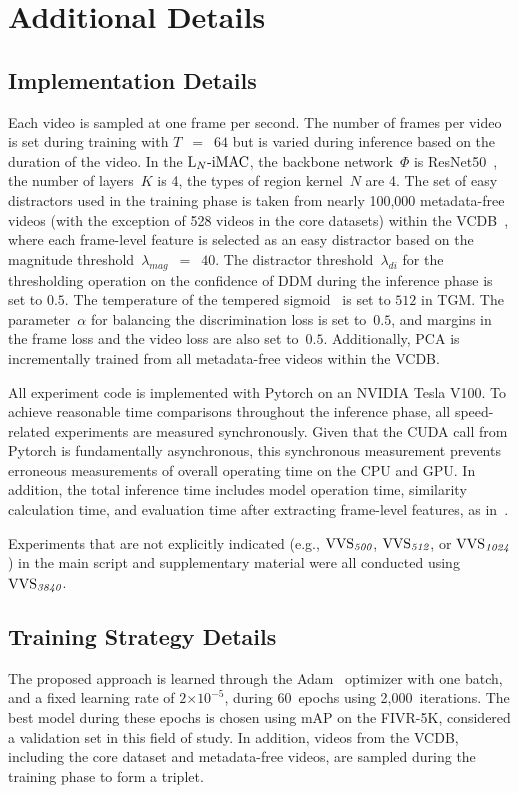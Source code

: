 \documentclass[10pt,twocolumn,letterpaper]{article}
\begin{document}
\section{Additional Details}\label{detail}
    \subsection{Implementation Details}\label{imple}
        Each video is sampled at one frame per second. The number of frames per video is set during training with $T$~$=$~$64$ but is varied during inference based on the duration of the video. In the $\textup{L}_{N}\textup{-iMAC}$, the backbone network~$\Phi$ is ResNet50~\cite{he2016deep}, the number of layers~$K$ is 4, the types of region kernel~$N$ are 4. The set of easy distractors used in the training phase is taken from nearly 100,000 metadata-free videos (with the exception of 528 videos in the core datasets) within the VCDB~\cite{jiang2014vcdb}, where each frame-level feature is selected as an easy distractor based on the magnitude threshold~$\lambda_{mag}$~$=$~$40$. The distractor threshold~$\lambda_{di}$ for the thresholding operation on the confidence of DDM during the inference phase is set to $0.5$. The temperature of the tempered sigmoid~\cite{papernot2021tempered} is set to $512$ in TGM. The parameter~$\alpha$ for balancing the discrimination loss is set to~$0.5$, and margins in the frame loss and the video loss are also set to~$0.5$. Additionally, PCA is incrementally trained from all metadata-free videos within the VCDB.
        
        All experiment code is implemented with Pytorch on an NVIDIA Tesla V100. To achieve reasonable time comparisons throughout the inference phase, all speed-related experiments are measured synchronously. Given that the CUDA call from Pytorch is fundamentally asynchronous, this synchronous measurement prevents erroneous measurements of overall operating time on the CPU and GPU. In addition, the total inference time includes model operation time, similarity calculation time, and evaluation time after extracting frame-level features, as in~\cite{ng2022vrag}.

        Experiments that are not explicitly indicated (e.g., $\textup{VVS}_{\textit{500}}$, $\textup{VVS}_{\textit{512}}$, or $\textup{VVS}_{\textit{1024}}$) in the main script and supplementary material were all conducted using $\textup{VVS}_{\textit{3840}}$.

    \subsection{Training Strategy Details}\label{strategy}
        The proposed approach is learned through the Adam~\cite{kingma2014adam} optimizer with one batch, and a fixed learning rate of $2$$\times$$10^{-5}$, during $60$~epochs using 2,000~iterations. The best model during these epochs is chosen using mAP on the FIVR-5K, considered a validation set in this field of study. In addition, videos from the VCDB, including the core dataset and metadata-free videos, are sampled during the training phase to form a triplet.
        
\end{document}
